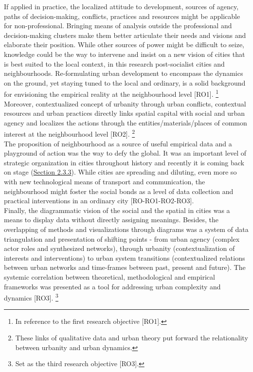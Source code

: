 \documentclass[11pt]{report}
\begin{document}
{If applied in practice, the localized attitude to  development, sources of agency, paths of decision-making, conflicts, practices and resources might be applicable for non-professional. 
Bringing means of analysis outside the professional and decision-making clusters make them better articulate their needs and visions and elaborate their position.
While other sources of power might be difficult to seize, knowledge could be the way to intervene and insist on a new vision of cities that is best suited to the local context, in this research post-socialist cities and neighbourhoods.
Re-formulating urban development to encompass the dynamics on the ground, yet staying tuned to the local and ordinary, is a solid background for envisioning the empirical reality at the neighbourhood level [RO1].
\footnote{In reference to the first research objective [RO1].}
Moreover, contextualized concept of urbanity through urban conflicts, contextual resources and urban practices directly links spatial capital with social and urban agency and localizes the actions through the entities/materials/places of common interest at the neighbourhood level [RO2].
\footnote{These links of qualitative data and urban theory put forward the relationality between urbanity and urban dynamics.}
\\

The proposition of neighbourhood as a source of  useful empirical data and a playground of action was the way to defy the global. It was an important level of strategic organization in cities throughout history and recently it is coming back on stage (\href{Section 2.3.3}{Section 2.3.3}).
While cities are spreading and diluting, even more so with new technological means of transport and communication, the neighbourhood might foster the social bonds as a level of data collection and practical interventions in an ordinary city [RO-RO1-RO2-RO3].
\\

Finally, the diagrammatic vision of the social and the spatial  in cities was a means to display data without directly assigning meanings.
Besides, the overlapping of methods and visualizations through diagrams was a system of data triangulation and presentation of shifting points - from urban agency (complex actor roles and synthesized networks), through urbanity (contextualization of interests and interventions) to urban system transitions (contextualized relations between urban networks and time-frames between past, present and future). The systemic correlation between theoretical, methodological and empirical frameworks was presented as a tool for addressing urban complexity and dynamics [RO3].
\footnote{Set as the third research objective [RO3].}

}
\end{document}
